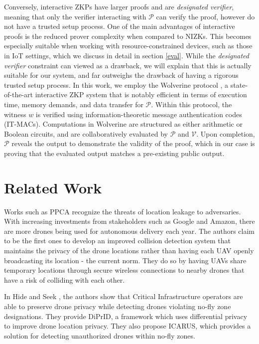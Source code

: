 \documentclass[9pt,sigconf,screen]{acmart}
\newcommand{\Prv}{$\mathcal{P}$\xspace}
\newcommand{\Vrf}{$\mathcal{V}$\xspace}
\begin{document}
Conversely, interactive ZKPs have larger proofs and are \textit{designated verifier}, meaning that only the verifier interacting with \Prv can verify the proof, however do not have a trusted setup process. One of the main advantages of interactive proofs is the reduced prover complexity when compared to NIZKs. This becomes especially suitable when working with resource-constrained devices, such as those in IoT settings, which we discuss in detail in section \ref{eval}. While the \textit{designated verifier} constraint can viewed as a drawback, we will explain that this is actually suitable for our system, and far outweighs the drawback of having a rigorous trusted setup process. In this work, we employ the Wolverine protocol \cite{passwordAuth}, a state-of-the-art interactive ZKP system that is notably efficient in terms of execution time, memory demands, and data transfer for \Prv. Within this protocol, the witness $w$ is verified using information-theoretic message authentication codes (IT-MACs). Computations in Wolverine are structured as either arithmetic or Boolean circuits, and are collaboratively evaluated by \Prv and \Vrf. Upon completion, \Prv reveals the output to demonstrate the validity of the proof, which in our case is proving that the evaluated output matches a pre-existing public output. 
 
\section{Related Work}\label{relatedWork}

Works such as PPCA \cite{PPCA} recognize the threats of location leakage to adversaries. With increasing investments from stakeholders such as Google and Amazon, there are more drones being used for autonomous delivery each year. The authors claim to be the first ones to develop an improved collision detection system that maintains the privacy of the drone locations rather than having each UAV openly broadcasting its location - the current norm. They do so by having UAVs share temporary locations through secure wireless connections to nearby drones that have a risk of colliding with each other. 

In Hide and Seek \cite{hideAndSeek}, the authors show that Critical Infrastructure operators are able to preserve drone privacy while detecting drones violating no-fly zone designations. They provide DiPrID, a framework which uses differential privacy to improve drone location privacy. They also propose ICARUS, which provides a solution for detecting unauthorized drones within no-fly zones. 
\end{document}
